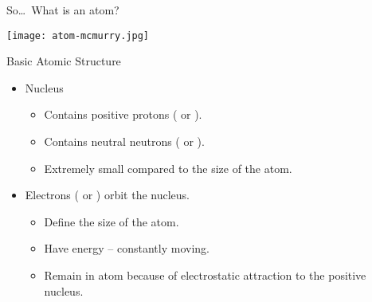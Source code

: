 \documentclass[notes=only]{beamer}
\begin{document}


\begin{frame}{So\ldots\ What is an atom?}
	\centering

	\texttt{[image: atom-mcmurry.jpg]}
\end{frame}

\begin{frame}{Basic Atomic Structure}
	\begin{itemize}
		\item \alert{Nucleus}
			\begin{itemize}
				\item Contains positive \alert{protons}
					( or ).
				\item Contains neutral \alert{neutrons} (
					or ).
				\item Extremely small compared to the size of
					the atom.
			\end{itemize}
		\item \alert{Electrons} ( or ) orbit the
			nucleus.
			\begin{itemize}
				\item Define the size of the atom.
				\item Have energy -- constantly moving.
				\item Remain in atom because of electrostatic
					attraction to the positive nucleus.
			\end{itemize}
	\end{itemize}
\end{frame}
\end{document}
